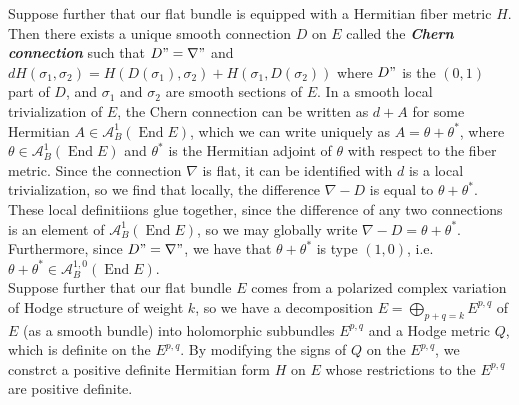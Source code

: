 \documentclass[psamsfonts, 12pt]{amsart}
\theoremstyle{definition}
\theoremstyle{remark}
\newcommand{\ib}[1]{\textbf{\textit{#1}}}
\newcommand{\dbar}{\overline{\partial}}
\DeclareMathOperator{\End}{End}
\begin{document}
Suppose further that our flat bundle is equipped with a Hermitian fiber metric
$H$. Then there exists a unique smooth connection $D$ on $E$ called the
\ib{Chern connection} such that $D" = \nabla"$ and
$dH(\sigma_1,\sigma_2) = H(D(\sigma_1),\sigma_2) + H(\sigma_1,D(\sigma_2))$
where $D"$ is the $(0,1)$ part of $D$, and $\sigma_1$ and $\sigma_2$
are smooth sections of $E$. In a smooth local trivialization of $E$,
the Chern connection can be written as $d + A$ for some Hermitian
$A \in \mathcal{A}^1_B(\End E)$, which we can write uniquely as
$A = \theta + \theta^*$, where $\theta \in \mathcal{A}^1_B(\End E)$ and
$\theta^*$ is the Hermitian adjoint of $\theta$ with respect to the fiber metric.
Since the connection $\nabla$ is  flat, it can be identified with $d$ is a local
trivialization, so we find that locally, the difference $\nabla - D$ is equal
to $\theta + \theta^*$. These local definitiions glue together, since the
difference of any two connections is an element of $\mathcal{A}^1_B(\End E)$,
so we may globally write $\nabla - D = \theta + \theta^*$. Furthermore,
since $D" = \nabla"$, we have that $\theta+\theta^*$ is type $(1,0)$, i.e.
$\theta+\theta^* \in \mathcal{A}^{1,0}_B(\End E)$.\\

Suppose further that our flat bundle $E$ comes from a polarized
complex variation of Hodge structure of weight $k$, so we have a decomposition
$E = \bigoplus_{p+q=k} E^{p,q}$ of $E$ (as a smooth bundle) into holomorphic
subbundles $E^{p,q}$ and a Hodge metric $Q$, which is definite on the $E^{p,q}$.
By modifying the signs of $Q$ on the $E^{p,q}$, we constrct a positive
definite Hermitian form $H$ on $E$ whose restrictions to the $E^{p,q}$
are positive definite.
\fi
%
\iffalse
\section{The Kodaira-Spencer Map}
The Kodaira-Spencer map has a fairly explicit geometric description in terms of a
trivialization of the family $\pi : \mathcal{X} \to B$ and the Dolbeault isomorphism
$H^{0,1}_{\dbar}(X,T_X) \cong H^1(X,T_X)$. From theorem 4.3, we obtain
a smooth map $T_b : \mathcal{X} \to X_b$ such that the fibers are complex submanifolds
of $\mathcal{X}$ and $(T_b,\pi)$ is a trivialization of $\mathcal{X}$. Fix
a vector $v \in T_{B,b}$, and consider the constant vector field
$V$ on $TB \cong B \times T_{B,b}$ where $V_b = v$. We can then extend this
to $TX \times TB$ by making the second component $0$, and then taking
the pushforward along the inverse of the trivialization gives a
complex vector field on $\mathcal{X}$ of type $(1,0)$, which we will also
call $V$. Restricting $V$ to the fiber $X_b = X$ then gives a smooth section of
$T_X$, and then the class represented by $\dbar (V\vert_{X})$ is the
value of $\rho(v)$
\fi
%
\newpage
%
\nocite{*}
%
\printbibliography
%
\end{document}

